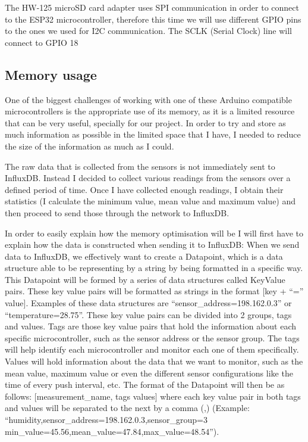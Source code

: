 \documentclass[12pt]{article}
\begin{document}
The HW-125 microSD card adapter uses SPI communication in order to connect to the ESP32 microcontroller, therefore this time we will use different GPIO pins to the ones we used for I2C communication. The SCLK (Serial Clock) line will connect to GPIO 18

\subsection{Memory usage}

One of the biggest challenges of working with one of these Arduino compatible microcontrollers is the appropriate use of its memory, as it is a limited resource that can be very useful, specially for our project. In order to try and store as much information as possible in the limited space that I have, I needed to reduce the size of the information as much as I could.\par

The raw data that is collected from the sensors is not immediately sent to InfluxDB. Instead I decided to collect various readings from the sensors over a defined period of time. Once I have collected enough readings, I obtain their statistics (I calculate the minimum value, mean value and maximum value) and then proceed to send those through the network to InfluxDB.\par 

In order to easily explain how the memory optimisation will be I will first have to explain how the data is constructed when sending it to InfluxDB: When we send data to InfluxDB, we effectively want to create a Datapoint, which is a data structure able to be representing by a string by being formatted in a specific way. This Datapoint will be formed by a series of data structures called KeyValue pairs. These key value pairs will be formatted as strings in the format [key + ``='' value]. Examples of these data structures are ``sensor\_address=198.162.0.3'' or ``temperature=28.75''. These key value pairs can be divided into 2 groups, tags and values. Tags are those key value pairs that hold the information about each specific microcontroller, such as the sensor address or the sensor group. The tags will help identify each microcontroller and monitor each one of them specifically. Values will hold information about the data that we want to monitor, such as the mean value, maximum value or even the different sensor configurations like the time of every push interval, etc. The format of the Datapoint will then be as follows: [measurement\_name, tags values] where each key value pair in both tags and values will be separated to the next by a comma (,) (Example: ``humidity,sensor\_address=198.162.0.3,sensor\_group=3 min\_value=45.56,mean\_value=47.84,max\_value=48.54'').\par
\end{document}
